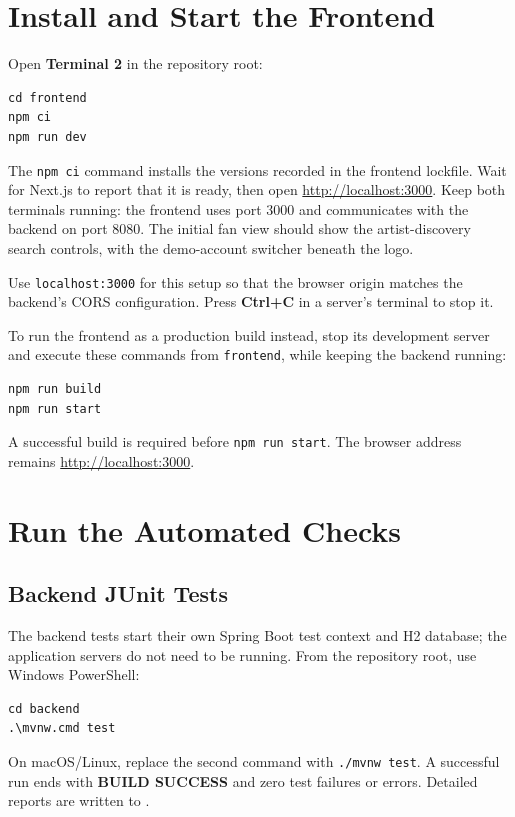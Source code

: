 \documentclass[11pt]{report}
\begin{document}
\section{Install and Start the Frontend}
Open \textbf{Terminal 2} in the repository root:
\begin{samepage}
\begin{verbatim}
cd frontend
npm ci
npm run dev
\end{verbatim}
\end{samepage}
The \texttt{npm ci} command installs the versions recorded in the frontend lockfile. Wait for Next.js to report that it is ready, then open \url{http://localhost:3000}. Keep both terminals running: the frontend uses port 3000 and communicates with the backend on port 8080. The initial fan view should show the artist-discovery search controls, with the demo-account switcher beneath the logo.

Use \texttt{localhost:3000} for this setup so that the browser origin matches the backend's CORS configuration. Press \textbf{Ctrl+C} in a server's terminal to stop it.

To run the frontend as a production build instead, stop its development server and execute these commands from \texttt{frontend}, while keeping the backend running:
\begin{samepage}
\begin{verbatim}
npm run build
npm run start
\end{verbatim}
\end{samepage}
A successful build is required before \texttt{npm run start}. The browser address remains \url{http://localhost:3000}.

\section{Run the Automated Checks}
\subsection{Backend JUnit Tests}
The backend tests start their own Spring Boot test context and H2 database; the application servers do not need to be running. From the repository root, use Windows PowerShell:
\begin{samepage}
\begin{verbatim}
cd backend
.\mvnw.cmd test
\end{verbatim}
\end{samepage}
On macOS/Linux, replace the second command with \texttt{./mvnw test}. A successful run ends with \textbf{BUILD SUCCESS} and zero test failures or errors. Detailed reports are written to .
\end{document}
